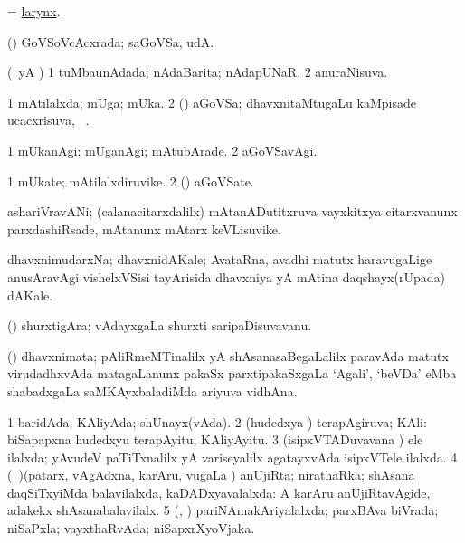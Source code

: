 \bentry 
{} 
\gl{\nA}
\expl{}
\bmng
 = \hyperref{kandict_l.pdf}{L}{larynx}{larynx}. 
\emng
\eentry

\bentry
{} 
\gl{\gu}
\expl{}
\bmng
 (\dhavxni) GoVSoVcAcxrada; saGoVSa, udA.  
\emng
\eentry

\bentry 
{} 
\gl{\gu}
\expl{}
\bmng
 (\kAparx\ yA \alaMshA) 
\bnum
\num{1} tuMbaunAdada; nAdaBarita; nAdapUNaR. 
\num{2} anuraNisuva. 
\enum
\emng
\eentry

\bentry 
{} 
\gl{\gu}
\expl{}
\bmng
\bnum
\num{1} mAtilalxda; mUga; mUka. 
\num{2} (\dhavxni) aGoVSa; dhavxnitaMtugaLu kaMpisade ucacxrisuva, \udA\ . 
\enum
\emng
\eentry

\bentry
{} 
\gl{\kirxvi}
\expl{}
\bmng
\bnum
\num{1} mUkanAgi; mUganAgi; mAtubArade. 
\num{2} aGoVSavAgi. 
\enum
\emng
\eentry

\bentry
{} 
\gl{\nA}
\expl{}
\bmng
\bnum
\num{1} mUkate; mAtilalxdiruvike. 
\num{2} (\dhavxni) aGoVSate. 
\enum
\emng
\eentry

\bentry
{} 
\gl{\nA}
\expl{}
\bmng
 ashariVravANi; (calanacitarxdalilx) mAtanADutitxruva vayxkitxya citarxvanunx parxdashiRsade, mAtanunx mAtarx keVLisuvike. 
\emng
\eentry

\bentry 
{} 
\gl{\nA}
\expl{}
\bmng
 dhavxnimudarxNa; dhavxnidAKale; AvataRna, avadhi matutx haravugaLige anusAravAgi vishelxVSisi tayArisida dhavxniya yA mAtina daqshayx(rUpada) dAKale. 
\emng
\eentry

\bentry
{} 
\gl{\nA}
\expl{}
\bmng
 (\saM) shurxtigAra; vAdayxgaLa shurxti saripaDisuvavanu. 
\emng
\eentry

\bentry
{}
\gl{\nA}
\bmng
(\ame) dhavxnimata; pAliRmeMTinalilx yA shAsanasaBegaLalilx paravAda matutx virudadhxvAda matagaLanunx pakaSx parxtipakaSxgaLa `Agali', `beVDa' eMba shabadxgaLa saMKAyxbaladiMda ariyuva vidhAna. 
\emng
\eentry

\bentry 
{} 
\gl{\gu}
\expl{}
\bmng
\bnum
\num{1} baridAda; KAliyAda; shUnayx(vAda). 
\num{2} (hudedxya \vi) terapAgiruva; KAli:  biSapapxna hudedxyu terapAyitu, KAliyAyitu. 
\num{3} (isipxVTADuvavana \vi) ele ilalxda; yAvudeV paTiTxnalilx yA variseyalilx agatayxvAda isipxVTele ilalxda. 
\num{4} (\kanmu\ \nAyxshA)(patarx, vAgAdxna, karAru, \mo vugaLa \vi) anUjiRta; nirathaRka; shAsana daqSiTxyiMda balavilalxda, kaDADxyavalalxda:  A karAru anUjiRtavAgide, adakekx shAsanabalavilalx. 
\num{5} (\kAparx, \alaMshA) pariNAmakAriyalalxda; parxBAva biVrada; niSaPxla; vayxthaRvAda; niSapxrXyoVjaka. 
\enum
\emng

